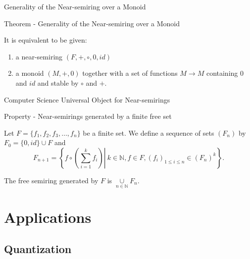 \documentclass[11pt]{beamer}
\begin{document}
\begin{frame}{Generality of the Near-semiring over a Monoid}

\begin{block}{Theorem - Generality of the Near-semiring over a Monoid}

	It is equivalent to be given:
	
	\begin{enumerate}
	
		\item a near-semiring $(F,+,\circ,0,id)$
		
		\item a monoid $(M,+,0)$ together with a set of functions $M \to M$ containing $0$ and $id$ and stable by $\circ$ and $+$.
	
	\end{enumerate}

\end{block}

\end{frame}

\begin{frame}{Computer Science Universal Object for Near-semirings}

\begin{block}{Property - Near-semirings generated by a finite free set}

	Let $F = \{ f_1, f_2, f_3, \dots , f_n \}$ be a finite set. We define a sequence of sets $(F_n)$ by $F_0=\{0,id\} \cup F$ and 
$$F_{n+1} = \left\{ \left. f \circ \left( \overset{k}{\underset{i=1}{\sum}} f_i \right) \right| \ k \in \mathbb{N}, f \in F, (f_i)_{1 \leq i \leq n} \in (F_n)^k \right\} .$$

The free semiring generated by $F$ is $ \underset{n \in \mathbb{N}}{\cup} F_n$.

\end{block}

\end{frame}

\section{Applications}

\subsection{Quantization}
\end{document}
